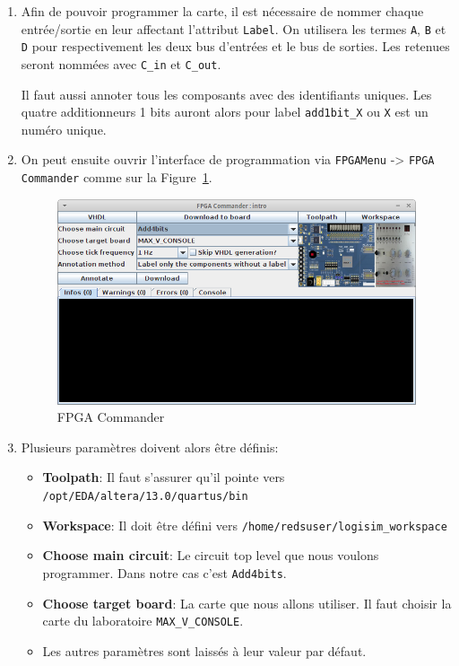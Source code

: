 \documentclass[nosolution]{exercice}
\begin{document}
\begin{enumerate}
\item Afin de pouvoir programmer la carte, il est nécessaire de nommer chaque entrée/sortie en leur affectant
l'attribut \texttt{Label}. On utilisera les termes \texttt{A}, \texttt{B} et \texttt{D} pour respectivement les deux bus
d'entrées et le bus de sorties. Les retenues seront nommées avec \texttt{C\_in} et \texttt{C\_out}.

Il faut aussi annoter tous les composants avec des identifiants uniques. Les quatre additionneurs 1 bits auront alors pour
label \texttt{add1bit\_X} ou \texttt{X} est un numéro unique.

\item On peut ensuite ouvrir l'interface de programmation via \texttt{FPGAMenu} -> \texttt{FPGA Commander}
comme sur la Figure~\ref{fig_FPGACommander}.

\begin{figure}[H]
\begin{center}
\includegraphics[scale=0.45]{images/logisim_fpgaCommander.png}
\caption{\label{fig_FPGACommander}FPGA Commander}
\end{center}
\end{figure}

\item Plusieurs paramètres doivent alors être définis:
\begin{itemize}
\item \textbf{Toolpath}: Il faut s'assurer qu'il pointe vers\\ \texttt{/opt/EDA/altera/13.0/quartus/bin}
\item \textbf{Workspace}: Il doit être défini vers \texttt{/home/redsuser/logisim\_workspace} %
\item \textbf{Choose main circuit}: Le circuit top level que nous voulons programmer. Dans notre cas c'est
\texttt{Add4bits}.
\item \textbf{Choose target board}: La carte que nous allons utiliser. Il faut choisir la carte du laboratoire
\texttt{MAX\_V\_CONSOLE}.
\item Les autres paramètres sont laissés à leur valeur par défaut.
\end{itemize}


\end{enumerate}
\end{document}
